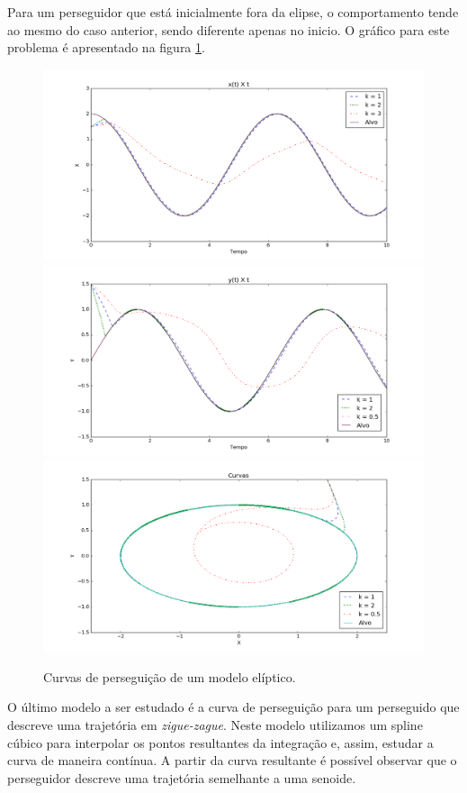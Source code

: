 \documentclass[a4paper,10pt]{article}
\begin{document}
  Para um perseguidor que está inicialmente fora da elipse, o comportamento tende ao mesmo do caso anterior, sendo diferente apenas no inicio. O gráfico para este problema é apresentado na figura \ref{fig:curva-el-1}.
  
  \begin{figure}[H]
   \includegraphics[scale=0.45]{el-1-X.png}
   \includegraphics[scale = 0.45]{el-1-Y.png}
   \includegraphics[width=\textwidth]{el-1-XY.png}
   \label{fig:curva-el-1}
   \caption{Curvas de perseguição de um modelo elíptico.}
  \end{figure}
  
  O último modelo a ser estudado é a curva de perseguição para um perseguido que descreve uma trajetória em \emph{zigue-zague}. Neste modelo utilizamos um spline cúbico para interpolar os pontos resultantes da integração e, assim, estudar a curva de maneira contínua. A partir da curva resultante é possível observar que o perseguidor descreve uma trajetória semelhante a uma senoide.
  
\end{document}
